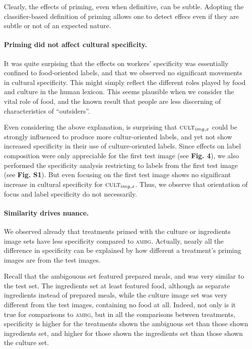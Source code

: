 \documentclass[a4paper]{report}
\begin{document}
Clearly, the effects of
priming, even when definitive, can be subtle. Adopting the classifier-based
definition of priming allows one to detect effecs even if they are subtle or
not of an expected nature.

\paragraph{Priming did not affect cultural specificity.}
It was quite surpising that the effects on workers' specificity was essentially
confined to food-oriented labels, and that we observed no significant movements
in cultural specificity.   This might simply reflect the different roles
played by food and culture in the human lexicon.  This seems plausible when we 
consider the vital role of food, and the known result that people are less
discerning of characteristics of ``outsiders''.

Even considering the above explanation, is surprising that 
$\textsc{cult}_{img,x}$ could be strongly influenced to produce more 
cultur-oriented labels, and yet not show increased 
specificity in their use of culture-oriented labels.  Since effects on 
label composition were only appreciable for the first test image 
(see \textbf{Fig. 4}), we also
performed the specificity analysis restricting to labels from the first
test image (see \textbf{Fig. S1}).  But even focusing on the first test image
shows no significant increase in cultural specificity for 
$\textsc{cult}_{img,x}$.  Thus, we observe that orientation of focus and 
label specificity do not necessarily.


\paragraph{Similarity drives nuance.}
We observed already that treatments primed with the 
culture or ingredients image sets have less specificity compared to 
\textsc{ambg}.  Actually, nearly all the difference in specificity
can be explained by how different a treatment's priming images are from the 
test images.  

Recall that the ambigouous set featured prepared meals, and 
was very similar to the test set.  The ingredients set at least featured 
food, although as separate ingredients instead of prepared meals, while the
culture image set was very different from the test images, containing no food
at all.
Indeed, not only is it true for comparisons to \textsc{ambg}, but in all the 
comparisons between treatments, specificity is higher for the 
treatments shown the ambiguous set than those shown ingredients set, 
and higher for those shown the ingredients set than those shown the culture 
set.
\end{document}
